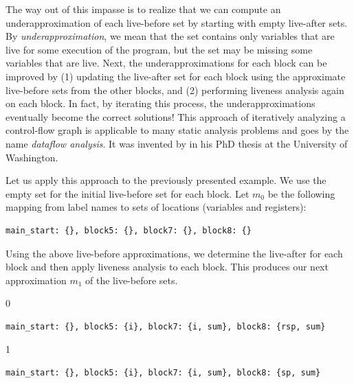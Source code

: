 \documentclass[7x10]{TimesAPriori_MIT}%
\def\xeightysixEd{0}
\def\riscvEd{1}
\def\architecture{1}
\numberwithin{theorem}{chapter}
\numberwithin{definition}{chapter}
\numberwithin{equation}{chapter}
\begin{document}
The way out of this impasse is to realize that we can compute an
underapproximation of each live-before set by starting with empty
live-after sets.  By \emph{underapproximation}, we mean that the set
contains only variables that are live for some execution of the
program, but the set may be missing some variables that are live.
Next, the underapproximations for each block can be improved by (1)
updating the live-after set for each block using the approximate
live-before sets from the other blocks, and (2) performing liveness
analysis again on each block.  In fact, by iterating this process, the
underapproximations eventually become the correct solutions!
%
This approach of iteratively analyzing a control-flow graph is
applicable to many static analysis problems and goes by the name
\emph{dataflow analysis}.  It was invented by
\citet{Kildall:1973vn} in his PhD thesis at the University of
Washington.

Let us apply this approach to the previously presented example. We use
the empty set for the initial live-before set for each block. Let
$m_0$ be the following mapping from label names to sets of locations
(variables and registers):
\begin{center}
\begin{lstlisting}
main_start: {}, block5: {}, block7: {}, block8: {}
\end{lstlisting}
\end{center}
Using the above live-before approximations, we determine the
live-after for each block and then apply liveness analysis to each
block.  This produces our next approximation $m_1$ of the live-before
sets.
{\if\architecture\xeightysixEd
\begin{center}
  \begin{lstlisting}
main_start: {}, block5: {i}, block7: {i, sum}, block8: {rsp, sum}
\end{lstlisting}
\end{center}
\fi}
{\if\architecture\riscvEd
\begin{center}
  \begin{lstlisting}
main_start: {}, block5: {i}, block7: {i, sum}, block8: {sp, sum}
\end{lstlisting}
\end{center}
\fi}
\end{document}

